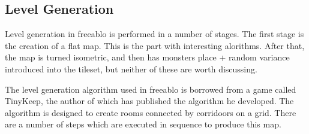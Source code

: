 \newpage
	
\subsection{Level Generation}
    Level generation in freeablo is performed in a number of stages. The first stage is the creation of a flat map. This is the part with interesting alorithms.
    After that, the map is turned isometric, and then has monsters place + random variance introduced into the tileset, but neither of these are worth discussing.

    \mbox{}

    The level generation algorithm used in freeablo is borrowed from a game called TinyKeep\cite{tinykeep}, the author of which has published the algorithm he developed\cite{tinygen}.
    The algorithm is designed to create rooms connected by corridoors on a grid.
    There are a number of steps which are executed in sequence to produce this map.
